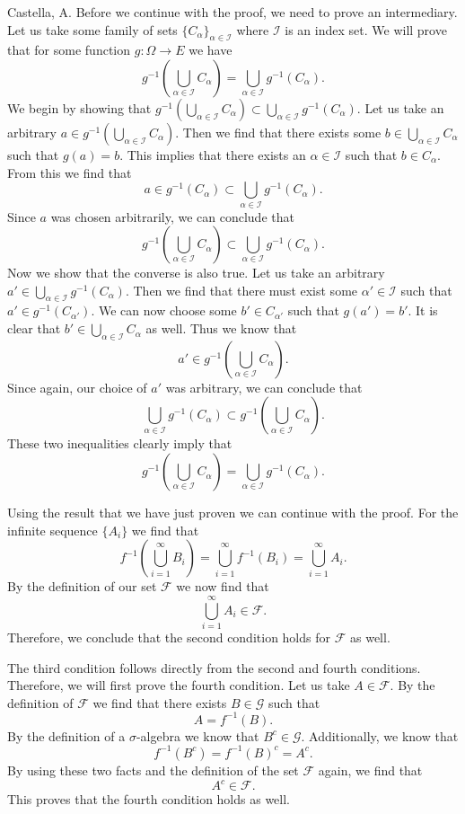 \begin{solution}[2.4]{Castella, A.}
    Before we continue with the proof, we need to prove an intermediary. Let us take some family of sets $\{C_\alpha\}_{\alpha\in\mathcal{I}}$ where $\mathcal{I}$ is an index set. We will prove that for some function $g : \Omega \rightarrow E$ we have
    $$
        g^{-1}\left(\bigcup_{\alpha\in\mathcal{I}}C_\alpha\right) = \bigcup_{\alpha\in\mathcal{I}}g^{-1}(C_\alpha).
    $$
    We begin by showing that $g^{-1}\left(\bigcup_{\alpha\in\mathcal{I}}C_\alpha\right) \subset \bigcup_{\alpha\in\mathcal{I}}g^{-1}(C_\alpha)$. Let us take an arbitrary $a \in g^{-1}\left(\bigcup_{\alpha\in\mathcal{I}}C_\alpha\right)$. Then we find that there exists some $b \in \bigcup_{\alpha\in\mathcal{I}}C_\alpha$ such that $g(a) = b$. This implies that there exists an $\alpha \in \mathcal{I}$ such that $b \in C_\alpha$. From this we find that
    $$
        a \in g^{-1}(C_\alpha) \subset \bigcup_{\alpha\in\mathcal{I}}g^{-1}(C_\alpha).
    $$
    Since $a$ was chosen arbitrarily, we can conclude that
    $$
        g^{-1}\left(\bigcup_{\alpha\in\mathcal{I}}C_\alpha\right) \subset \bigcup_{\alpha\in\mathcal{I}}g^{-1}(C_\alpha).
    $$
    Now we show that the converse is also true. Let us take an arbitrary $a' \in \bigcup_{\alpha\in\mathcal{I}}g^{-1}(C_\alpha)$. Then we find that there must exist some $\alpha' \in \mathcal{I}$ such that $a' \in g^{-1}(C_{\alpha'})$. We can now choose some $b' \in C_{\alpha'}$ such that $g(a') = b'$. It is clear that $b' \in \bigcup_{\alpha\in\mathcal{I}}C_\alpha$ as well. Thus we know that
    $$
        a' \in g^{-1}\left(\bigcup_{\alpha\in\mathcal{I}}C_\alpha\right).
    $$
    Since again, our choice of $a'$ was arbitrary, we can conclude that
    $$
        \bigcup_{\alpha\in\mathcal{I}}g^{-1}(C_\alpha) \subset g^{-1}\left(\bigcup_{\alpha\in\mathcal{I}}C_\alpha\right).
    $$
    These two inequalities clearly imply that
    $$
        g^{-1}\left(\bigcup_{\alpha\in\mathcal{I}}C_\alpha\right) = \bigcup_{\alpha\in\mathcal{I}}g^{-1}(C_\alpha).
    $$
    
    Using the result that we have just proven we can continue with the proof. For the infinite sequence $\{A_i\}$ we find that
    $$
        f^{-1}\left(\bigcup_{i=1}^\infty B_i\right) = \bigcup_{i=1}^\infty f^{-1}(B_i) = \bigcup_{i=1}^\infty A_i.
    $$
    By the definition of our set $\mathcal{F}$ we now find that
    $$
        \bigcup_{i=1}^\infty A_i \in \mathcal{F}.
    $$
    Therefore, we conclude that the second condition holds for $\mathcal{F}$ as well.
    
    The third condition follows directly from the second and fourth conditions. Therefore, we will first prove the fourth condition. Let us take $A \in \mathcal{F}$. By the definition of $\mathcal{F}$ we find that there exists $B \in \mathcal{G}$ such that
    $$
        A = f^{-1}(B).
    $$
    By the definition of a $\sigma$-algebra we know that $B^c \in \mathcal{G}$. Additionally, we know that
    $$
        f^{-1}(B^c) = f^{-1}(B)^c = A^c.
    $$
    By using these two facts and the definition of the set $\mathcal{F}$ again, we find that
    $$
        A^c \in \mathcal{F}.
    $$
    This proves that the fourth condition holds as well.
    

\end{solution}
